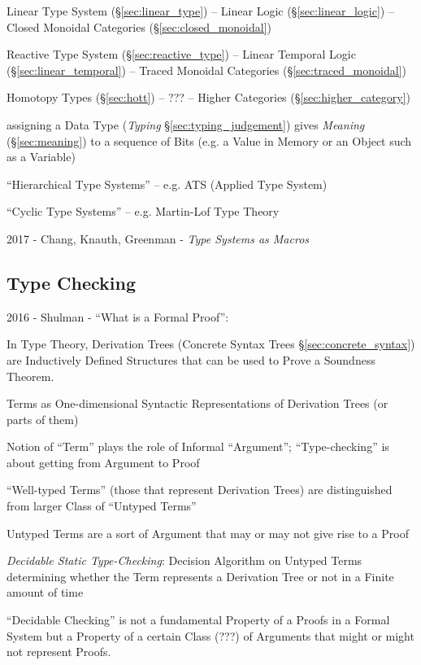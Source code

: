 Linear Type System (\S\ref{sec:linear_type}) -- Linear Logic
(\S\ref{sec:linear_logic}) -- Closed Monoidal Categories
(\S\ref{sec:closed_monoidal})

Reactive Type System (\S\ref{sec:reactive_type}) -- Linear Temporal
Logic (\S\ref{sec:linear_temporal}) -- Traced Monoidal Categories
(\S\ref{sec:traced_monoidal})

Homotopy Types (\S\ref{sec:hott}) -- ??? -- Higher Categories
(\S\ref{sec:higher_category})

assigning a Data Type (\emph{Typing} \S\ref{sec:typing_judgement})
gives \emph{Meaning} (\S\ref{sec:meaning}) to a sequence of Bits (e.g.
a Value in Memory or an Object such as a Variable)

``Hierarchical Type Systems'' -- e.g. ATS (Applied Type System)

``Cyclic Type Systems'' -- e.g. Martin-Lof Type Theory

2017 - Chang, Knauth, Greenman - \emph{Type Systems as Macros}



\subsection{Type Checking}\label{sec:type_checking}

2016 - Shulman - ``What is a Formal Proof'': %

In Type Theory, Derivation Trees (Concrete Syntax Trees
\S\ref{sec:concrete_syntax}) are Inductively Defined Structures that
can be used to Prove a Soundness Theorem.

Terms as One-dimensional Syntactic Representations of Derivation Trees
(or parts of them)

Notion of ``Term'' plays the role of Informal ``Argument'';
``Type-checking'' is about getting from Argument to Proof

``Well-typed Terms'' (those that represent Derivation Trees) are
distinguished from larger Class of ``Untyped Terms''

Untyped Terms are a sort of Argument that may or may not give rise to
a Proof

\emph{Decidable Static Type-Checking}: Decision Algorithm on Untyped
Terms determining whether the Term represents a Derivation Tree or not
in a Finite amount of time

``Decidable Checking'' is not a fundamental Property of a Proofs in a
Formal System but a Property of a certain Class (???) of Arguments
that might or might not represent Proofs.

